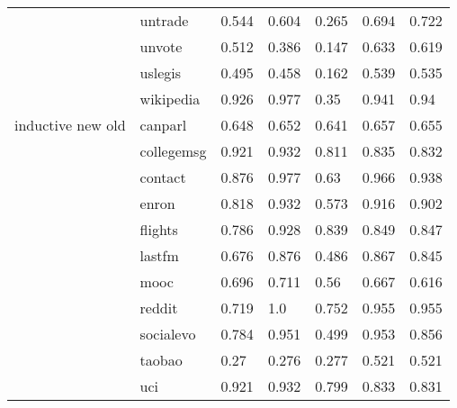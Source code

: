 \begin{tabular}{lllllll}
             & untrade &          0.544 &                 0.604 &                     0.265 &         0.694 &                    0.722 \\
             & unvote &          0.512 &                 0.386 &                     0.147 &         0.633 &                    0.619 \\
             & uslegis &          0.495 &                 0.458 &                     0.162 &         0.539 &                    0.535 \\
             & wikipedia &          0.926 &                 0.977 &                      0.35 &         0.941 &                     0.94 \\
inductive new old & canparl &          0.648 &                 0.652 &                     0.641 &         0.657 &                    0.655 \\
             & collegemsg &          0.921 &                 0.932 &                     0.811 &         0.835 &                    0.832 \\
             & contact &          0.876 &                 0.977 &                      0.63 &         0.966 &                    0.938 \\
             & enron &          0.818 &                 0.932 &                     0.573 &         0.916 &                    0.902 \\
             & flights &          0.786 &                 0.928 &                     0.839 &         0.849 &                    0.847 \\
             & lastfm &          0.676 &                 0.876 &                     0.486 &         0.867 &                    0.845 \\
             & mooc &          0.696 &                 0.711 &                      0.56 &         0.667 &                    0.616 \\
             & reddit &          0.719 &                   1.0 &                     0.752 &         0.955 &                    0.955 \\
             & socialevo &          0.784 &                 0.951 &                     0.499 &         0.953 &                    0.856 \\
             & taobao &           0.27 &                 0.276 &                     0.277 &         0.521 &                    0.521 \\
             & uci &          0.921 &                 0.932 &                     0.799 &         0.833 &                    0.831 \\

\end{tabular}
